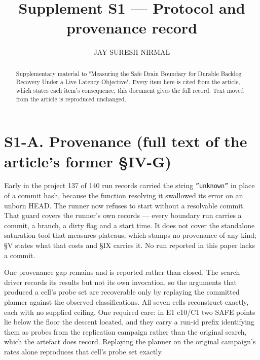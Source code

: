 \documentclass{ieeeaccess}
\begin{document}
\title{Supplement S1 --- Protocol and provenance record}
\author{\uppercase{Jay Suresh Nirmal}}
\address[1]{Independent Researcher, Boston, MA, USA}

\begin{abstract}
Supplementary material to "Measuring the Safe Drain Boundary for Durable Backlog Recovery Under a Live Latency Objective". Every item here is cited from the article, which states each item's consequence; this document gives the full record. Text moved from the article is reproduced unchanged.
\end{abstract}

\titlepgskip=-15pt
\maketitle

\section*{S1-A. Provenance (full text of the article's former \S{}IV-G)}

Early in the project 137 of 140 run records carried the string \texttt{''unknown''} in place of a commit hash, because the function resolving it swallowed its error on an unborn HEAD. The runner now refuses to start without a resolvable commit. That guard covers the runner's own records --- every boundary run carries a commit, a branch, a dirty flag and a start time. It does not cover the standalone saturation tool that measures plateaus, which stamps no provenance of any kind; \S{}V states what that costs and \S{}IX carries it. No run reported in this paper lacks a commit.

One provenance gap remains and is reported rather than closed. The search driver records its results but not its own invocation, so the arguments that produced a cell's probe set are recoverable only by replaying the committed planner against the observed classifications. All seven cells reconstruct exactly, each with no supplied ceiling. One required care: in E1 c10/C1 two SAFE points lie below the floor the descent located, and they carry a run-id prefix identifying them as probes from the replication campaign rather than the original search, which the artefact does record. Replaying the planner on the original campaign's rates alone reproduces that cell's probe set exactly.
\end{document}
